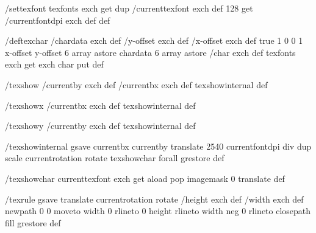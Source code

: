 /settexfont
 { texfonts exch get dup /currenttexfont exch def
   128 get /currentfontdpi exch def } def

/deftexchar
 { /chardata exch def
   /y-offset exch def
   /x-offset exch def
   true
   1 0 0 1 x-offset y-offset 6 array astore
   chardata
   6 array astore /char exch def
   texfonts exch get exch char put } def

/texshow
 { /currentby exch def
   /currentbx exch def
   texshowinternal } def

/texshowx
 { /currentbx exch def
   texshowinternal } def

/texshowy
 { /currentby exch def
   texshowinternal } def

/texshowinternal
 { gsave
   currentbx currentby translate
   2540 currentfontdpi div dup scale
   currentrotation rotate
   {texshowchar} forall
   grestore } def

/texshowchar
   { currenttexfont exch get aload pop imagemask 0 translate } def

/texrule
 { gsave
   translate
   currentrotation rotate
   /height exch def
   /width exch def
   newpath
    0 0 moveto
    width 0 rlineto
    0 height rlineto
    width neg 0 rlineto
    closepath
    fill
   grestore } def

